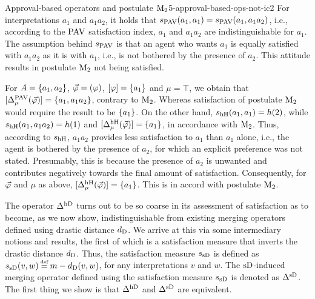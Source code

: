 \begin{xmpl}{Approval-based operators and postulate $\ppm{2}$}{5-approval-based-ops-not-ic2}
	For interpretations $a_1$ and $a_1a_2$, 
	it holds that $\sat_\pav(a_1,a_1)=\sat_\pav(a_1,a_1a_2)$,
	i.e., according to the $\pav$ satisfaction index, 
	$a_1$ and $a_1a_2$ are indistinguishable for $a_1$. 
	The assumption behind $\sat_\pav$ 
	is that an agent who wants $a_1$ is equally satisfied
	with $a_1a_2$ as it is with $a_1$,
	i.e., is not bothered by the presence of $a_2$.
	This attitude results in postulate $\ppm{2}$ not being satisfied.

	For $\Atoms=\set{a_1,a_2}$, $\P=(\phi)$,	
	$[\phi]=\set{a_1}$ 
	and $\mu=\top$,
	we obtain that $\mods{\me^{\pav}_{\mu}(\P)}=\set{a_1,a_1a_2}$,
	contrary to $\ppm{2}$.
	Whereas satisfaction of postulate $\ppm{2}$ would require the result to be $\set{a_1}$.
	On the other hand,
	$
	\sat_\hhamming(a_1,a_1) 
	=h(2)$,
	while 
	$
	\sat_\hhamming(a_1,a_1a_2) = 
	h(1)$ and $\mods{\me^{\hhamming}_{\mu}(\P)}=\set{a_1}$, 
	in accordance with $\ppm{2}$.
	Thus, according to 
	$\sat_\hhamming$, 
	$a_1a_2$ provides less satisfaction to $a_1$ than $a_1$ alone,
	i.e., the agent is bothered by the presence of $a_2$, for which an explicit preference was not stated.
	Presumably, this is because the presence of $a_2$ is unwanted and contributes negatively 
	towards the final amount of satisfaction.
	Consequently, for $\P$ and $\mu$ as above, 
	$
	\mods{\me^{\hhamming}_{\mu}(\P)}=\set{a_1}$.
	This is in accord with postulate $\ppm{2}$.
\end{xmpl}

The operator $\me^\hdrastic$ 
turns out to be so coarse in its assessment of satisfaction as to become,
as we now show, indistinguishable from existing merging operators 
defined using drastic distance $\dd_\drastic$.
We arrive at this via some intermediary notions and results,
the first of which is a satisfaction measure that inverts the
drastic distance $\dd_{\drastic}$.
Thus, the satisfaction measure $\sat_\sdrastic$ is defined as
$\sat_\sdrastic(v,w)\defeq m-\dd_\drastic(v,w)$,
for any interpretations $v$ and $w$. 
The $\sdrastic$-induced merging operator defined 
using the satisfaction measure $\sat_\sdrastic$
is denoted as $\me^{\sdrastic}$.
The first thing we show is that 
$\me^{\hdrastic}$ and $\me^{\sdrastic}{}$ are equivalent.

